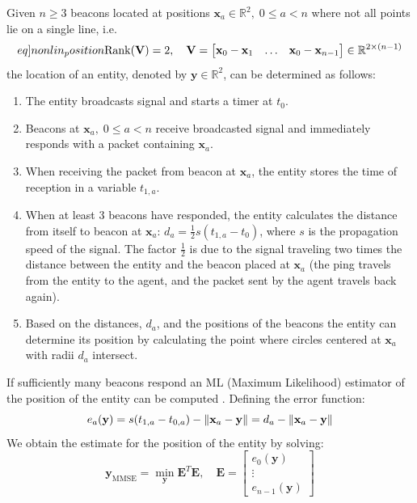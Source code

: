 Given $n\geq 3$ beacons located at positions $\mathbf{x}_{a}\in\mathbb{R}^{2},\; 0\leq a<n$ where not all points
lie on a single line, i.e.
\begin{equation}\label[eq]{nonlin_position}
  \mathrm{Rank}(\mathbf{V}) = 2,\quad \mathbf{V} = \begin{bmatrix}
    \mathbf{x}_{0} - \mathbf{x}_{1} &\hdots& \mathbf{x}_{0} - \mathbf{x}_{n-1}
  \end{bmatrix}\in\mathbb{R}^{2\times (n-1)}
\end{equation} the location 
of an entity, denoted by $\mathbf{y}\in\mathbb{R}^{2}$, can be determined as follows:
\begin{enumerate}
  \item The entity broadcasts signal and starts a timer at $t_{0}$.
  \item Beacons at $\mathbf{x}_{a},\; 0\leq a<n$ receive broadcasted signal and immediately responds with a packet containing $\mathbf{x}_{a}$.
  \item When receiving the packet from beacon at $\mathbf{x}_{a}$, the entity stores the time of reception in a variable $t_{1, a}$.
  \item When at least 3 beacons have responded, the entity calculates the distance
  from itself to beacon at $\mathbf{x}_{a}$: $d_{a} = \frac{1}{2}s(t_{1, a} - t_{0})$, where $s$ is the propagation speed of the signal. The factor $\frac{1}{2}$ is due to the signal traveling
  two times the distance between the entity and the beacon placed at $\mathbf{x}_{a}$ (the ping travels from the entity to the agent, and the packet
  sent by the agent travels back again).
  \item Based on the distances, $d_{a}$, and the positions of the beacons the entity can
  determine its position by calculating the point where circles centered at $\mathbf{x}_{a}$ with radii $d_{a}$ intersect.
\end{enumerate}
If sufficiently many beacons respond an ML (Maximum Likelihood) estimator of the position of the entity can be computed \cite{10.1145/381677.381693}.
Defining the error function:\begin{equation}
  e_{a}(\mathbf{y}) = s(t_{1, a} - t_{0, a}) - \left\lVert\mathbf{x}_{a} - \mathbf{y}\right\rVert = d_{a} - \left\lVert\mathbf{x}_{a} - \mathbf{y}\right\rVert
\end{equation}
We obtain the estimate for the position of the entity by solving:
\begin{equation}
  \mathbf{y}_{\mathrm{MMSE}} = \min_{\mathbf{y}} \mathbf{E}^{T}\mathbf{E},\quad\mathbf{E} = \begin{bmatrix}
    e_{0}(\mathbf{y})\\
    \vdots\\
    e_{n-1}(\mathbf{y})
  \end{bmatrix}
\end{equation}
